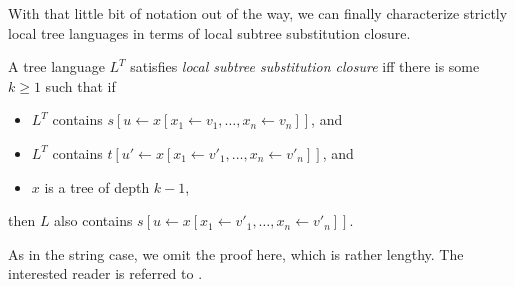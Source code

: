With that little bit of notation out of the way, we can finally characterize strictly local tree languages in terms of local subtree substitution closure.
%
\begin{definition}
    A tree language $L^T$ satisfies \emph{local subtree substitution closure} iff there is some $k \geq 1$ such that if
    \begin{itemize}
        \item $L^T$ contains $s[u \leftarrow x[x_1 \leftarrow v_1, \ldots, x_n \leftarrow v_n]]$, and
        \item $L^T$ contains $t[u' \leftarrow x[x_1 \leftarrow v'_1, \ldots, x_n \leftarrow v'_n]]$, and 
        \item $x$ is a tree of depth $k-1$,
    \end{itemize}
    then $L$ also contains $s[u \leftarrow x[x_1 \leftarrow v'_1, \ldots, x_n \leftarrow v'_n]]$.
\end{definition}
%
%
%
As in the string case, we omit the proof here, which is rather lengthy.
The interested reader is referred to \citet{Rogers97}.
%
